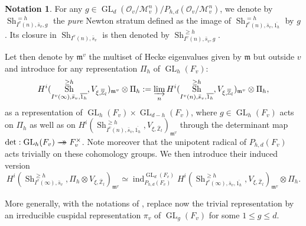 \documentclass[JEP,XML,SOM,Unicode,published]{cedram}
\newcommand{\onto}{\mathchoice{\to\hspace*{-5mm}\to}{\to\hspace*{-2.85mm}\to}{\to\hspace*{-3mm}\to}{\to\hspace*{-3mm}\to}}
\DeclareMathOperator{\GL}{GL}
\theoremstyle{plain}
\theoremstyle{definition}
\newtheorem{nota}[equation]{Notation}
\numberwithin{equation}{subsection}
\newcommand\Zm{{\mathbb Z}}
\newcommand\MC{{\mathcal M}}
\newcommand\OC{{\mathcal O}}
\DeclareMathOperator{\sh}{Sh}
\DeclareMathOperator{\ind}{ind}
\let \oo=\infty
\begin{document}
\begin{nota} \label{nota-strata}
For any $g \in \GL_d(\OC_v/\MC_v^n)/P_{h,d}(\OC_v/\MC_v^n)$, we denote by
$\sh^{=h}_{I^v(n),\bar s_v,g}$ the \emph{pure} Newton stratum defined as the image of
$\sh_{I^v(n),\bar s_v,\overline{1_{h}}}^{=h}$ by $g$.
Its closure in $\sh_{I^v(n),\bar s_v}$ is then denoted by
$\sh^{\geq h}_{I^v(n),\bar s_v,g}$.
\end{nota}

Let then denote by $\mathfrak m^v$ the multiset of
Hecke eigenvalues given by $\mathfrak m$ but outside $v$ and
introduce for any representation $\Pi_h$ of $\GL_h(F_v)$:
\[
H^i(\sh_{I^v(\oo),\bar s_v,\overline{1_{h}}}^{\geq h}, V_{\xi,\overline \Zm_l})_{\mathfrak m^v} \otimes \Pi_h:=
\varinjlim_{{n}} H^i(\sh_{I^v(n),\bar s_v,\overline{1_{h}}}^{\geq h},
V_{\xi,\overline \Zm_l})_{\mathfrak m^v} \otimes \Pi_h,
\]
as a representation of $\GL_h(F_v) \times \GL_{d-h}(F_v)$, where $g \in \GL_h(F_v)$
acts on $\Pi_h$ as well as on $H^i(\sh_{I^v(n),\bar s_v,\overline{1_{h}}}^{\geq h},
V_{\xi,\overline \Zm_l})_{\mathfrak m^v}$ through the determinant map \hbox{$\det: \GL_h(F_v)\onto F_v^\times$}. Note moreover that the unipotent radical of
$P_{h,d}(F_v)$ acts trivially on these cohomology groups.
We then introduce their induced version
\[
H^i(\sh^{\geq h}_{I^v(\oo),\bar s_v},\Pi_h \otimes V_{\xi,\overline \Zm_l})_{\mathfrak m^v}
\simeq \ind_{P_{h,d}(F_v)}^{\GL_d(F_v)} H^i(\sh_{I^v(\oo),\bar s_v,\overline{1_h}}^{\geq h}, V_{\xi,\overline \Zm_l})_{\mathfrak m^v} \otimes \Pi_h.
\]

More generally, with the notations of \cite{boyer-invent2}, replace now the trivial representation by
an irreducible cuspidal representation $\pi_v$ of $\GL_g(F_v)$ for some $1 \leq g \leq d$.
\end{document}
